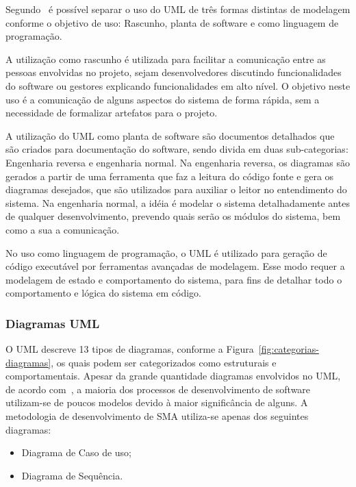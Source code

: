 Segundo~\cite{fowler04} é possível separar o uso do UML de três formas distintas de modelagem conforme o objetivo de uso: Rascunho, planta de software e como linguagem de programação. 

A utilização como rascunho é utilizada para facilitar a comunicação entre as pessoas envolvidas no projeto, sejam desenvolvedores discutindo funcionalidades do software ou gestores explicando funcionalidades em alto nível. O objetivo neste uso é a comunicação de alguns aspectos do sistema de forma rápida, sem a necessidade de formalizar artefatos para o projeto.

A utilização do UML como planta de software são documentos detalhados que são criados para documentação do software, sendo divida em duas sub-categorias: Engenharia reversa e engenharia normal. Na engenharia reversa, os diagramas são gerados a partir de uma ferramenta que faz a leitura do código fonte e gera os diagramas desejados, que são utilizados para auxiliar o leitor no entendimento do sistema. Na engenharia normal, a idéia é modelar o sistema detalhadamente antes de qualquer desenvolvimento, prevendo quais serão os módulos do sistema, bem como a sua a comunicação.

No uso como linguagem de programação, o UML é utilizado para geração de código executável por ferramentas avançadas de modelagem. Esse modo requer a modelagem de estado e comportamento do sistema, para fins de detalhar todo o comportamento e lógica do sistema em código.

\subsubsection{Diagramas UML}

O UML descreve 13 tipos de diagramas, conforme a Figura~\ref{fig:categorias-diagramas}, os quais podem ser categorizados como estruturais e comportamentais. Apesar da grande quantidade diagramas envolvidos no UML, de acordo com~\cite{larman08}, a maioria dos processos de desenvolvimento de software utilizam-se de poucos modelos devido à maior significância de alguns. A metodologia de desenvolvimento de SMA utiliza-se apenas dos seguintes diagramas:

\begin{itemize}
	\item Diagrama de Caso de uso;
	\item Diagrama de Sequência.
\end{itemize}

